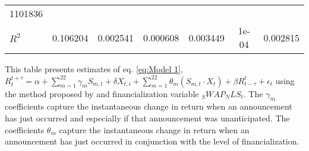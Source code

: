\begin{sidewaystable}
{\begin{tabular}{@{}lllllllllllll@{}}
1101836 }                                                 \\ \textbf{$R^2$}             &\multicolumn{2}{c}{ 0.106204 }                                                 & \multicolumn{2}{c}{ 0.002541 }                                                 & \multicolumn{2}{c}{ 0.000608 }                                                 & \multicolumn{2}{c}{ 0.003449 }                                                 & \multicolumn{2}{c}{ 1e-04 }                                                   & \multicolumn{2}{c}{ 0.002815 }                                                 \\ \bottomrule 
\end{tabular}
}
\begin{tablenotes}\item 
    \singlespacing
    \footnotesize
    This table presents estimates of eq. \ref{eq:Model 1}, $R_{t}^{t+\tau}=\alpha+\sum_{m=1}^{22} \gamma_m S_{m,t}+ \delta X_{t,i} + \sum_{m=1}^{22} \theta_m (S_{m,t} \cdot X_t)+\beta R_{t-\tau}^{t}+\epsilon_{t}$ using the method proposed by \citet{andersen2007real} and financialization variable $_SWAP_NLS_t$. The $\gamma_m$ coefficients capture the instantaneous change in return when an announcement has just occurred and especially if that announcement was unanticipated. The coefficients $\theta_m$ capture the instantaneous change in return when an announcement has just occurred in conjunction with the level of financialization.
\end{tablenotes}
\end{sidewaystable}
